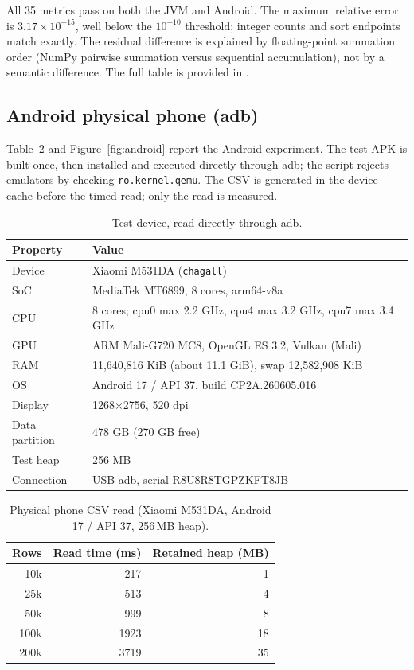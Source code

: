 \documentclass[11pt,a4paper]{article}
\newcommand{\code}[1]{\texttt{#1}}
\begin{document}
All 35 metrics pass on both the JVM and Android.  The maximum relative error is
$3.17\times10^{-15}$, well below the $10^{-10}$ threshold; integer counts and sort endpoints match
exactly.  The residual difference is explained by floating-point summation order (NumPy pairwise
summation versus sequential accumulation), not by a semantic difference.  The full table is
provided in .

\subsection{Android physical phone (adb)}

Table~\ref{tab:android} and Figure~\ref{fig:android} report the Android experiment.  The test APK
is built once, then installed and executed directly through adb; the script rejects emulators by
checking \code{ro.kernel.qemu}.  The CSV is generated in the device cache before the timed read;
only the read is measured.

\begin{table}[H]
\centering
\footnotesize
\caption{Test device, read directly through adb.}
\label{tab:device}
\begin{tabular}{@{}ll@{}}
\toprule
Property & Value \\
\midrule
Device & Xiaomi M531DA (\code{chagall}) \\
SoC & MediaTek MT6899, 8 cores, arm64-v8a \\
CPU & 8 cores; cpu0 max 2.2 GHz, cpu4 max 3.2 GHz, cpu7 max 3.4 GHz \\
GPU & ARM Mali-G720 MC8, OpenGL ES 3.2, Vulkan (Mali) \\
RAM & 11,640,816 KiB (about 11.1 GiB), swap 12,582,908 KiB \\
OS & Android 17 / API 37, build CP2A.260605.016 \\
Display & 1268$\times$2756, 520 dpi \\
Data partition & 478 GB (270 GB free) \\
Test heap & 256 MB \\
Connection & USB adb, serial R8U8R8TGPZKFT8JB \\
\bottomrule
\end{tabular}
\end{table}

\begin{table}[H]
\centering
\small
\caption{Physical phone CSV read (Xiaomi M531DA, Android 17 / API 37, 256\,MB heap).}
\label{tab:android}
\begin{tabular}{@{}rrr@{}}
\toprule
Rows & Read time (ms) & Retained heap (MB) \\
\midrule
10k  & 217  & 1 \\
25k  & 513  & 4 \\
50k  & 999  & 8 \\
100k & 1923 & 18 \\
200k & 3719 & 35 \\
\bottomrule
\end{tabular}
\end{table}
\end{document}
